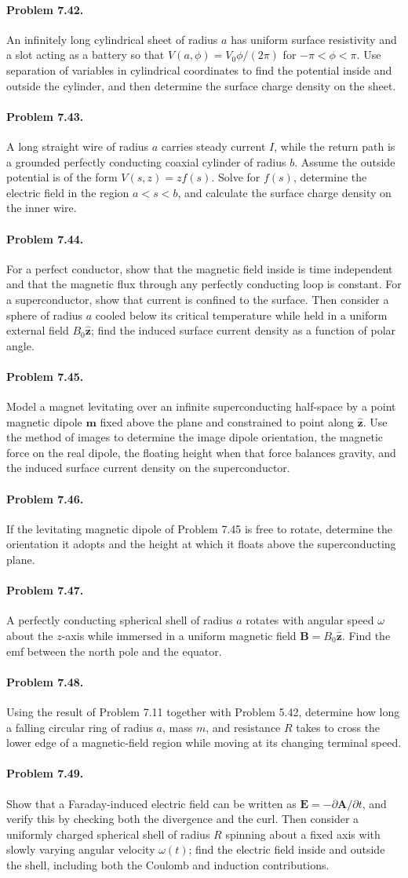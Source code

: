 \documentclass{aa}
\newcommand{\problemstatement}[2]{%
\paragraph{Problem #1.}#2\par\medskip
}
\begin{document}
\problemstatement{7.42}{An infinitely long cylindrical sheet of radius \(a\) has uniform surface resistivity and a slot acting as a battery so that \(V(a,\phi)=V_0\phi/(2\pi)\) for \(-\pi<\phi<\pi\). Use separation of variables in cylindrical coordinates to find the potential inside and outside the cylinder, and then determine the surface charge density on the sheet.}
\problemstatement{7.43}{A long straight wire of radius \(a\) carries steady current \(I\), while the return path is a grounded perfectly conducting coaxial cylinder of radius \(b\). Assume the outside potential is of the form \(V(s,z)=zf(s)\). Solve for \(f(s)\), determine the electric field in the region \(a<s<b\), and calculate the surface charge density on the inner wire.}
\problemstatement{7.44}{For a perfect conductor, show that the magnetic field inside is time independent and that the magnetic flux through any perfectly conducting loop is constant. For a superconductor, show that current is confined to the surface. Then consider a sphere of radius \(a\) cooled below its critical temperature while held in a uniform external field \(B_0\hat{\mathbf z}\); find the induced surface current density as a function of polar angle.}
\problemstatement{7.45}{Model a magnet levitating over an infinite superconducting half-space by a point magnetic dipole \( \mathbf m\) fixed above the plane and constrained to point along \( \hat{\mathbf z}\). Use the method of images to determine the image dipole orientation, the magnetic force on the real dipole, the floating height when that force balances gravity, and the induced surface current density on the superconductor.}
\problemstatement{7.46}{If the levitating magnetic dipole of Problem 7.45 is free to rotate, determine the orientation it adopts and the height at which it floats above the superconducting plane.}
\problemstatement{7.47}{A perfectly conducting spherical shell of radius \(a\) rotates with angular speed \(\omega\) about the \(z\)-axis while immersed in a uniform magnetic field \( \mathbf B=B_0\hat{\mathbf z}\). Find the emf between the north pole and the equator.}
\problemstatement{7.48}{Using the result of Problem 7.11 together with Problem 5.42, determine how long a falling circular ring of radius \(a\), mass \(m\), and resistance \(R\) takes to cross the lower edge of a magnetic-field region while moving at its changing terminal speed.}
\problemstatement{7.49}{Show that a Faraday-induced electric field can be written as \( \mathbf E=-\partial \mathbf A/\partial t\), and verify this by checking both the divergence and the curl. Then consider a uniformly charged spherical shell of radius \(R\) spinning about a fixed axis with slowly varying angular velocity \(\omega(t)\); find the electric field inside and outside the shell, including both the Coulomb and induction contributions.}
\end{document}
